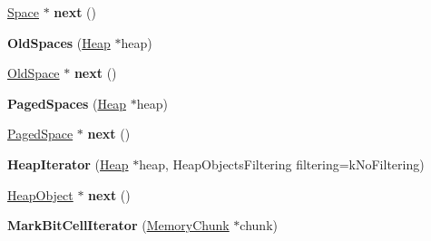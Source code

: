\begin{DoxyCompactItemize}
\item 
\hyperlink{classv8_1_1internal_1_1_space}{Space} $\ast$ {\bfseries next} ()\hypertarget{classv8_1_1internal_1_1_b_a_s_e___e_m_b_e_d_d_e_d_a59ed9f38100b49bab6496fd5641e7451}{}\label{classv8_1_1internal_1_1_b_a_s_e___e_m_b_e_d_d_e_d_a59ed9f38100b49bab6496fd5641e7451}

\item 
{\bfseries Old\+Spaces} (\hyperlink{classv8_1_1internal_1_1_heap}{Heap} $\ast$heap)\hypertarget{classv8_1_1internal_1_1_b_a_s_e___e_m_b_e_d_d_e_d_a7dabe0977fa828b1d893355c199d5f0a}{}\label{classv8_1_1internal_1_1_b_a_s_e___e_m_b_e_d_d_e_d_a7dabe0977fa828b1d893355c199d5f0a}

\item 
\hyperlink{classv8_1_1internal_1_1_old_space}{Old\+Space} $\ast$ {\bfseries next} ()\hypertarget{classv8_1_1internal_1_1_b_a_s_e___e_m_b_e_d_d_e_d_a6e2f633a13a5cd6d8e845cc2f487047e}{}\label{classv8_1_1internal_1_1_b_a_s_e___e_m_b_e_d_d_e_d_a6e2f633a13a5cd6d8e845cc2f487047e}

\item 
{\bfseries Paged\+Spaces} (\hyperlink{classv8_1_1internal_1_1_heap}{Heap} $\ast$heap)\hypertarget{classv8_1_1internal_1_1_b_a_s_e___e_m_b_e_d_d_e_d_aa0a856e90b520061cf0b97fe94554615}{}\label{classv8_1_1internal_1_1_b_a_s_e___e_m_b_e_d_d_e_d_aa0a856e90b520061cf0b97fe94554615}

\item 
\hyperlink{classv8_1_1internal_1_1_paged_space}{Paged\+Space} $\ast$ {\bfseries next} ()\hypertarget{classv8_1_1internal_1_1_b_a_s_e___e_m_b_e_d_d_e_d_ac401733818d7cb9cf0d3f86c3f097414}{}\label{classv8_1_1internal_1_1_b_a_s_e___e_m_b_e_d_d_e_d_ac401733818d7cb9cf0d3f86c3f097414}

\item 
{\bfseries Heap\+Iterator} (\hyperlink{classv8_1_1internal_1_1_heap}{Heap} $\ast$heap, Heap\+Objects\+Filtering filtering=k\+No\+Filtering)\hypertarget{classv8_1_1internal_1_1_b_a_s_e___e_m_b_e_d_d_e_d_a858bd3e51f2d48d82578b681559f8839}{}\label{classv8_1_1internal_1_1_b_a_s_e___e_m_b_e_d_d_e_d_a858bd3e51f2d48d82578b681559f8839}

\item 
\hyperlink{classv8_1_1internal_1_1_heap_object}{Heap\+Object} $\ast$ {\bfseries next} ()\hypertarget{classv8_1_1internal_1_1_b_a_s_e___e_m_b_e_d_d_e_d_aab1ff40d5aad8eef39fcb37e3250b7ad}{}\label{classv8_1_1internal_1_1_b_a_s_e___e_m_b_e_d_d_e_d_aab1ff40d5aad8eef39fcb37e3250b7ad}

\item 
{\bfseries Mark\+Bit\+Cell\+Iterator} (\hyperlink{classv8_1_1internal_1_1_memory_chunk}{Memory\+Chunk} $\ast$chunk)\hypertarget{classv8_1_1internal_1_1_b_a_s_e___e_m_b_e_d_d_e_d_a72d482f91569fc5602833aac05cbbe09}{}\label{classv8_1_1internal_1_1_b_a_s_e___e_m_b_e_d_d_e_d_a72d482f91569fc5602833aac05cbbe09}


\end{DoxyCompactItemize}
